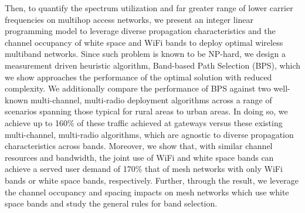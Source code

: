 Then, to quantify the spectrum utilization and far greater range of lower carrier 
frequencies on multihop access networks, 
we present an integer 
linear programming model to leverage diverse propagation characteristics and 
the  channel occupancy of white space and WiFi bands to deploy optimal wireless multiband 
networks. Since such problem is known to be NP-hard, we design a measurement driven 
heuristic algorithm, Band-based Path Selection (BPS), which we show approaches 
the performance of the optimal solution with reduced complexity.  We additionally 
compare the performance of BPS against two well-known multi-channel, multi-radio 
deployment algorithms across a range of scenarios spanning those typical for 
rural areas to urban areas. In doing so, we achieve up to 160\% of these traffic achieved 
at gateways versus these existing multi-channel, multi-radio algorithms, which are 
agnostic to diverse propagation characteristics across bands.  Moreover, we show 
that, with similar channel resources and bandwidth, the joint use of WiFi and 
white space bands can achieve a served user demand of 170\% that of mesh networks 
with only WiFi bands or white space bands, respectively. Further, through the 
result, we leverage the channel occupancy and spacing impacts on mesh
networks which use white space bands and study the general rules for band selection.


